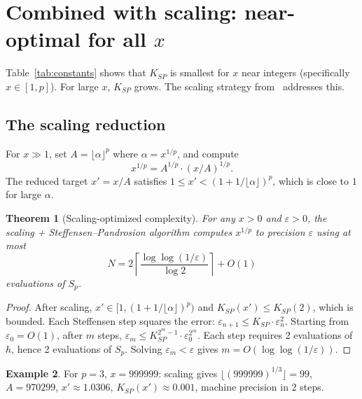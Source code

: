 \documentclass[10pt,a4paper,oneside]{book}
\newtheorem{theorem}{Theorem}[chapter]
\theoremstyle{definition}
\newtheorem{example}[theorem]{Example}
\theoremstyle{remark}
\newcommand{\eps}{\varepsilon}
\begin{document}
\section{Combined with scaling: near-optimal for all \texorpdfstring{$x$}{x}}
\label{sec:scaling}

Table~\ref{tab:constants} shows that $K_{SP}$ is smallest for $x$ near integers (specifically $x \in [1, p]$).  For large $x$, $K_{SP}$ grows.  The scaling strategy from~\cite{besevic2026} addresses this.

\subsection{The scaling reduction}

For $x \gg 1$, set $A = \lfloor \alpha \rfloor^p$ where $\alpha = x^{1/p}$, and compute
\[
  x^{1/p} = A^{1/p} \cdot (x/A)^{1/p}.
\]
The reduced target $x' = x/A$ satisfies $1 \leq x' < (1 + 1/\lfloor\alpha\rfloor)^p$, which is close to $1$ for large $\alpha$.

\begin{theorem}[Scaling-optimized complexity]
\label{thm:complexity}
For any $x > 0$ and $\eps > 0$, the scaling + Steffensen--Pandrosion algorithm computes $x^{1/p}$ to precision $\eps$ using at most
\begin{equation}
  \label{eq:complexity}
  N = 2\left\lceil \frac{\log\log(1/\eps)}{\log 2} \right\rceil + O(1)
\end{equation}
evaluations of $S_p$.
\end{theorem}

\begin{proof}
After scaling, $x' \in [1, (1+1/\lfloor\alpha\rfloor)^p)$ and $K_{SP}(x') \leq K_{SP}(2)$, which is bounded.  Each Steffensen step squares the error: $\eps_{n+1} \leq K_{SP} \cdot \eps_n^2$.  Starting from $\eps_0 = O(1)$, after $m$ steps, $\eps_m \leq K_{SP}^{2^m - 1} \cdot \eps_0^{2^m}$.  Each step requires 2 evaluations of $h$, hence 2 evaluations of $S_p$.  Solving $\eps_m < \eps$ gives $m = O(\log\log(1/\eps))$.
\end{proof}

\begin{example}
For $p = 3$, $x = 999999$: scaling gives $\lfloor (999999)^{1/3} \rfloor = 99$, $A = 970299$, $x' \approx 1.0306$, $K_{SP}(x') \approx 0.001$, machine precision in 2 steps.
\end{example}
\end{document}
